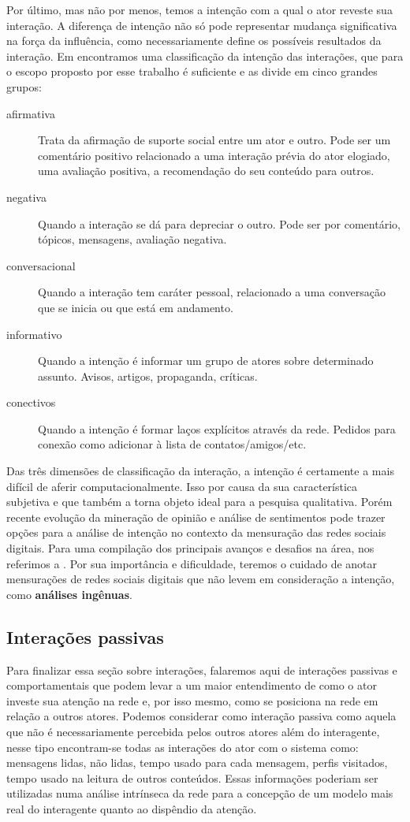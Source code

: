Por último, mas não por menos, temos a intenção com a qual o ator reveste sua
interação. A diferença de intenção não só pode representar mudança significativa
na força da influência, como necessariamente define os possíveis resultados da
interação. Em \citet{Recuero2008} encontramos uma classificação da intenção das
interações, que para o escopo proposto por esse trabalho é suficiente e as divide
em cinco grandes grupos:
\begin{description}
\item[afirmativa] Trata da afirmação de suporte social entre um ator e outro.
Pode ser um comentário positivo relacionado a uma interação prévia do ator
elogiado, uma avaliação positiva, a recomendação do seu conteúdo para outros.
\item[negativa] Quando a interação se dá para depreciar o outro. Pode ser por
comentário, tópicos, mensagens, avaliação negativa.
\item[conversacional] Quando a interação tem caráter pessoal, relacionado a uma
conversação que se inicia ou que está em andamento.
\item[informativo] Quando a intenção é informar um grupo de atores sobre
determinado assunto. Avisos, artigos, propaganda, críticas.
\item[conectivos] Quando a intenção é formar laços explícitos através da rede.
Pedidos para conexão como adicionar à lista de contatos/amigos/etc.
\end{description}
Das três dimensões de classificação da interação, a intenção é certamente a mais
difícil de aferir computacionalmente. Isso por causa da sua característica
subjetiva e que também a torna objeto ideal para a pesquisa qualitativa.
Porém recente evolução da mineração de opinião e análise de sentimentos pode
trazer opções para a análise de intenção no contexto da mensuração das redes
sociais digitais. Para uma compilação dos principais avanços e desafios na
área, nos referimos a \citet{Wilson2005, Ding2007, Pang2008}. Por sua
importância e dificuldade, teremos o cuidado de anotar mensurações de redes
sociais digitais que não levem em consideração a intenção, como
\textbf{análises ingênuas}.

\subsection{Interações passivas}

Para finalizar essa seção sobre interações, falaremos aqui de interações passivas
e comportamentais que podem levar a um maior entendimento de como o ator investe
sua atenção na rede e, por isso mesmo, como se posiciona na rede em relação a
outros atores. Podemos considerar como interação passiva como aquela que não é
necessariamente percebida pelos outros atores além do interagente, nesse tipo
encontram-se todas as interações do ator com o sistema como: mensagens lidas, não
lidas, tempo usado para cada mensagem, perfis visitados, tempo usado na leitura
de outros conteúdos. Essas informações poderiam ser utilizadas numa análise
intrínseca da rede para a concepção de um modelo mais real do interagente quanto
ao dispêndio da atenção.

